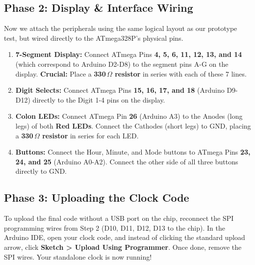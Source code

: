 \documentclass[11pt,a4paper]{article}
\begin{document}
\subsection*{Phase 2: Display \& Interface Wiring}
Now we attach the peripherals using the same logical layout as our prototype test, but wired directly to the ATmega328P's physical pins.
\begin{enumerate}
    \item \textbf{7-Segment Display:} Connect ATmega Pins \textbf{4, 5, 6, 11, 12, 13, and 14} (which correspond to Arduino D2-D8) to the segment pins A-G on the display. \textbf{Crucial:} Place a \textbf{330\,$\Omega$ resistor} in series with each of these 7 lines.
    \item \textbf{Digit Selects:} Connect ATmega Pins \textbf{15, 16, 17, and 18} (Arduino D9-D12) directly to the Digit 1-4 pins on the display.
    \item \textbf{Colon LEDs:} Connect ATmega Pin \textbf{26} (Arduino A3) to the Anodes (long legs) of both \textbf{Red LEDs}. Connect the Cathodes (short legs) to GND, placing a \textbf{330\,$\Omega$ resistor} in series for each LED.
    \item \textbf{Buttons:} Connect the Hour, Minute, and Mode buttons to ATmega Pins \textbf{23, 24, and 25} (Arduino A0-A2). Connect the other side of all three buttons directly to GND.
\end{enumerate}

\subsection*{Phase 3: Uploading the Clock Code}
To upload the final code without a USB port on the chip, reconnect the SPI programming wires from Step 2 (D10, D11, D12, D13 to the chip). In the Arduino IDE, open your clock code, and instead of clicking the standard upload arrow, click \textbf{Sketch > Upload Using Programmer}. Once done, remove the SPI wires. Your standalone clock is now running!
\end{document}
